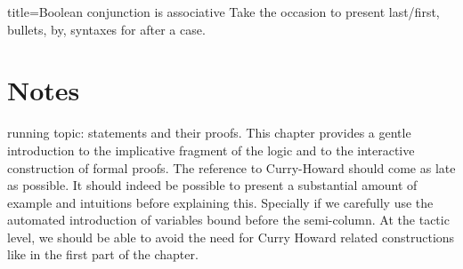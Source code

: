 \begin{coq}{title=Boolean conjunction is associative}
Take the occasion to present last/first, bullets, by, syntaxes for
\C{=> [|IH x xs]} after a case.


\section{Notes}

%
%
%

running topic: statements and their proofs. This chapter provides a gentle
introduction to the implicative fragment of the logic and to the
interactive construction of formal proofs. The reference to
Curry-Howard should come as late as possible. It should indeed be
possible to present a substantial amount of example and intuitions
before explaining this. Specially if we carefully use the automated
introduction of variables bound before the semi-column. At the tactic
level, we should be able to avoid the need for Curry Howard related
constructions like  in the first part of the chapter.


\end{coq}
